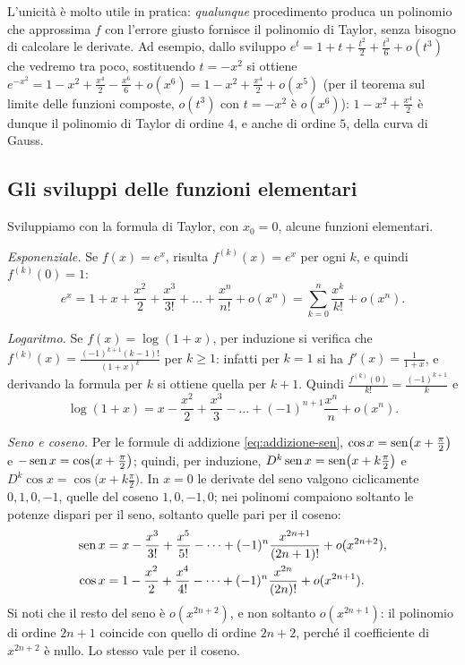 L'unicità è molto utile in pratica: \emph{qualunque} procedimento produca un polinomio
che approssima $f$ con l'errore giusto fornisce il polinomio di Taylor, senza bisogno di
calcolare le derivate. Ad esempio, dallo sviluppo $e^{t}=1+t+\frac{t^{2}}2+\frac{t^{3}}6+o(t^{3})$
che vedremo tra poco, sostituendo $t=-x^{2}$ si ottiene
$e^{-x^{2}}=1-x^{2}+\frac{x^{4}}2-\frac{x^{6}}6+o(x^{6})=1-x^{2}+\frac{x^{4}}2+o(x^{5})$
(per il teorema sul limite delle funzioni composte, $o(t^{3})$ con $t=-x^{2}$ è $o(x^{6})$):
$1-x^{2}+\frac{x^{4}}2$ è dunque il polinomio di Taylor di ordine $4$, e anche di ordine
$5$, della curva di Gauss.

\subsection{Gli sviluppi delle funzioni elementari}

Sviluppiamo con la formula di Taylor, con $x_{0}=0$, alcune funzioni elementari.

\emph{Esponenziale.} Se $f(x)=e^{x}$, risulta $f^{(k)}(x)=e^{x}$ per ogni $k$, e quindi
$f^{(k)}(0)=1$:
\begin{equation}\label{eq:taylor-exp}
  e^{x}=1+x+\frac{x^{2}}{2}+\frac{x^{3}}{3!}+\dots+\frac{x^{n}}{n!}+o(x^{n})
  =\sum_{k=0}^{n}\frac{x^{k}}{k!}+o(x^{n}) .
\end{equation}

\emph{Logaritmo.} Se $f(x)=\log(1+x)$, per induzione si verifica che
$f^{(k)}(x)=\frac{(-1)^{k+1}(k-1)!}{(1+x)^{k}}$ per $k\ge1$: infatti per $k=1$ si ha
$f'(x)=\frac1{1+x}$, e derivando la formula per $k$ si ottiene quella per $k+1$. Quindi
$\frac{f^{(k)}(0)}{k!}=\frac{(-1)^{k+1}}{k}$ e
\begin{equation}\label{eq:taylor-log}
  \log(1+x)=x-\frac{x^{2}}2+\frac{x^{3}}3-\dots+(-1)^{n+1}\frac{x^{n}}{n}+o(x^{n}) .
\end{equation}

\emph{Seno e coseno.} Per le formule di addizione \eqref{eq:addizione-sen},
$\cos x=\operatorname{sen}\bigl(x+\frac\pi2\bigr)$ e $-\operatorname{sen} x=\cos\bigl(x+\frac\pi2\bigr)$; quindi, per
induzione, $D^{k}\operatorname{sen} x=\operatorname{sen}\bigl(x+k\frac\pi2\bigr)$ e
$D^{k}\cos x=\cos\bigl(x+k\frac\pi2\bigr)$. In $x=0$ le derivate del seno valgono
ciclicamente $0,1,0,-1$, quelle del coseno $1,0,-1,0$; nei polinomi compaiono soltanto
le potenze dispari per il seno, soltanto quelle pari per il coseno:
\begin{align}
  \operatorname{sen} x&=x-\frac{x^{3}}{3!}+\frac{x^{5}}{5!}-\dots+(-1)^{n}\frac{x^{2n+1}}{(2n+1)!}
  +o(x^{2n+2}), \label{eq:taylor-sen}\\
  \cos x&=1-\frac{x^{2}}{2}+\frac{x^{4}}{4!}-\dots+(-1)^{n}\frac{x^{2n}}{(2n)!}
  +o(x^{2n+1}). \label{eq:taylor-cos}
\end{align}
Si noti che il resto del seno è $o(x^{2n+2})$, e non soltanto $o(x^{2n+1})$: il
polinomio di ordine $2n+1$ coincide con quello di ordine $2n+2$, perché il coefficiente
di $x^{2n+2}$ è nullo. Lo stesso vale per il coseno.

